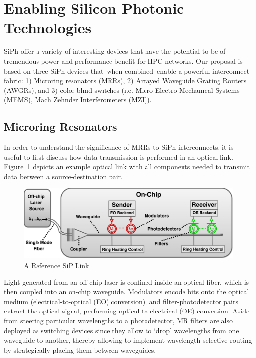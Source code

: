 \section{Enabling Silicon Photonic Technologies}
SiPh offer a variety of interesting devices that have the potential to be of tremendous power and performance benefit for HPC networks. Our proposal is based on three SiPh devices that--when combined--enable a powerful interconnect fabric: 1) Microring resonators (MRRs), 2) Arrayed Waveguide Grating Routers (AWGRs), and 3) color-blind switches (i.e. Micro-Electro Mechanical Systems (MEMS), Mach Zehnder Interferometers (MZI)). 

\subsection{Microring Resonators}
In order to understand the significance of MRRs to SiPh interconnects, it is useful to first discuss how data transmission is performed in an optical link. Figure~\ref{fig:olink} depicts an example optical link with all components needed to transmit data between a source-destination pair. 
\begin{figure}[!t]
	\centering
	\includegraphics[width=\linewidth,clip]{latex/Figures/olink.pdf}
	\vspace{0.01cm}
	\caption[A Reference SiP Link]{A Reference SiP Link}
	\label{fig:olink} 
\end{figure}
Light generated from an off-chip laser is confined inside an optical fiber, which is then coupled into an on-chip waveguide. Modulators encode bits onto the optical medium (electrical-to-optical (EO) conversion), and filter-photodetector pairs extract the optical signal, performing optical-to-electrical (OE) conversion. Aside from steering particular wavelengths to a photodetector, MR filters are also deployed as switching devices since they allow to `drop' wavelengths from one waveguide to another, thereby allowing to implement wavelength-selective routing by strategically placing them between waveguides. \\
